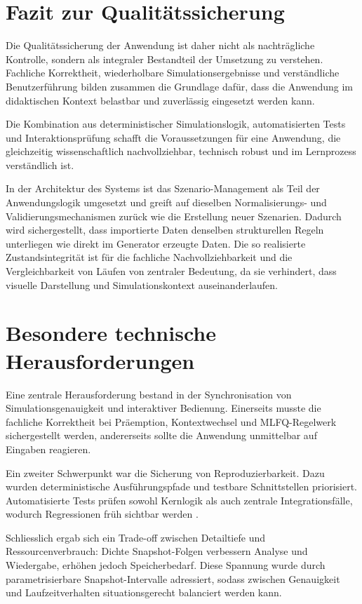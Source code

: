 \section{Fazit zur Qualitätssicherung}

Die Qualitätssicherung der Anwendung ist daher nicht als nachträgliche Kontrolle, sondern als integraler Bestandteil der Umsetzung zu verstehen. Fachliche Korrektheit, wiederholbare Simulationsergebnisse und verständliche Benutzerführung bilden zusammen die Grundlage dafür, dass die Anwendung im didaktischen Kontext belastbar und zuverlässig eingesetzt werden kann.

Die Kombination aus deterministischer Simulationslogik, automatisierten Tests und Interaktionsprüfung schafft die Voraussetzungen für eine Anwendung, die gleichzeitig wissenschaftlich nachvollziehbar, technisch robust und im Lernprozess verständlich ist.

In der Architektur des Systems ist das Szenario-Management als Teil der Anwendungslogik umgesetzt und greift auf dieselben Normalisierungs- und Validierungsmechanismen zurück wie die Erstellung neuer Szenarien. Dadurch wird sichergestellt, dass importierte Daten denselben strukturellen Regeln unterliegen wie direkt im Generator erzeugte Daten. Die so realisierte Zustandsintegrität ist für die fachliche Nachvollziehbarkeit und die Vergleichbarkeit von Läufen von zentraler Bedeutung, da sie verhindert, dass visuelle Darstellung und Simulationskontext auseinanderlaufen.

\section{Besondere technische Herausforderungen}

Eine zentrale Herausforderung bestand in der Synchronisation von Simulationsgenauigkeit und interaktiver Bedienung. Einerseits musste die fachliche Korrektheit bei Präemption, Kontextwechsel und MLFQ-Regelwerk sichergestellt werden, andererseits sollte die Anwendung unmittelbar auf Eingaben reagieren.

Ein zweiter Schwerpunkt war die Sicherung von Reproduzierbarkeit. Dazu wurden deterministische Ausführungspfade und testbare Schnittstellen priorisiert. Automatisierte Tests prüfen sowohl Kernlogik als auch zentrale Integrationsfälle, wodurch Regressionen früh sichtbar werden \cite{vitest}.

Schliesslich ergab sich ein Trade-off zwischen Detailtiefe und Ressourcenverbrauch: Dichte Snapshot-Folgen verbessern Analyse und Wiedergabe, erhöhen jedoch Speicherbedarf. Diese Spannung wurde durch parametrisierbare Snapshot-Intervalle adressiert, sodass zwischen Genauigkeit und Laufzeitverhalten situationsgerecht balanciert werden kann.

